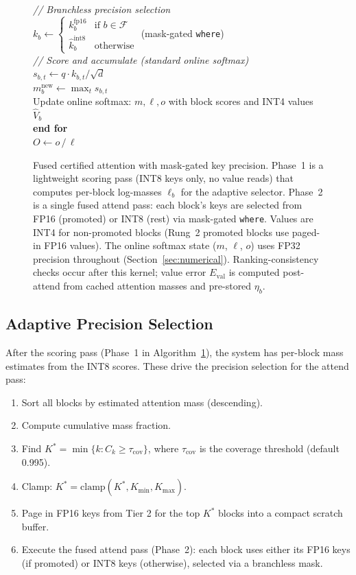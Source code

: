 \documentclass[10pt,twocolumn,a4paper]{article}
\theoremstyle{definition}
\theoremstyle{remark}
\begin{document}
\begin{figure}[!t]
\begin{center}
{{\quad \textit{// Branchless precision selection} \\
\quad $k_b \leftarrow \begin{cases} k^{\mathrm{fp16}}_b & \text{if } b \in \mathcal{F} \\ \hat{k}^{\mathrm{int8}}_b & \text{otherwise} \end{cases}$ \quad (mask-gated \texttt{where}) \\[2pt]
\quad \textit{// Score and accumulate (standard online softmax)} \\
\quad $s_{b,t} \leftarrow q \cdot k_{b,t} / \sqrt{d}$ \\
\quad $m_b^{\mathrm{new}} \leftarrow \max_t s_{b,t}$ \\
\quad Update online softmax: $m, \ell, o$ with block scores and INT4 values $\hat{V}_b$ \\
\textbf{end for} \\[3pt]
$O \leftarrow o \,/\, \ell$
}}
\end{center}
\caption{Fused certified attention with mask-gated key precision.  Phase~1 is a lightweight scoring pass (INT8 keys only, no value reads) that computes per-block log-masses $\ell_b$ for the adaptive selector.  Phase~2 is a single fused attend pass: each block's keys are selected from FP16 (promoted) or INT8 (rest) via mask-gated \texttt{where}.  Values are INT4 for non-promoted blocks (Rung~2 promoted blocks use paged-in FP16 values).  The online softmax state ($m$, $\ell$, $o$) uses FP32 precision throughout (Section~\ref{sec:numerical}).  Ranking-consistency checks occur after this kernel; value error $E_{\mathrm{val}}$ is computed post-attend from cached attention masses and pre-stored $\eta_b$.}
\label{alg:fused}
\end{figure}

\subsection{Adaptive Precision Selection}
\label{sec:adaptive}

After the scoring pass (Phase~1 in Algorithm~\ref{alg:fused}), the system has per-block mass estimates from the INT8 scores.  These drive the precision selection for the attend pass:

\begin{enumerate}[leftmargin=2em,itemsep=2pt]
  \item Sort all blocks by estimated attention mass (descending).
  \item Compute cumulative mass fraction.
  \item Find $K^* = \min\{k : C_k \geq \tau_{\mathrm{cov}}\}$, where $\tau_{\mathrm{cov}}$ is the coverage threshold (default 0.995).
  \item Clamp: $K^* = \mathrm{clamp}(K^*, K_{\min}, K_{\max})$.
  \item Page in FP16 keys from Tier 2 for the top $K^*$ blocks into a compact scratch buffer.
  \item Execute the fused attend pass (Phase~2): each block uses either its FP16 keys (if promoted) or INT8 keys (otherwise), selected via a branchless mask.
\end{enumerate}
\end{document}
